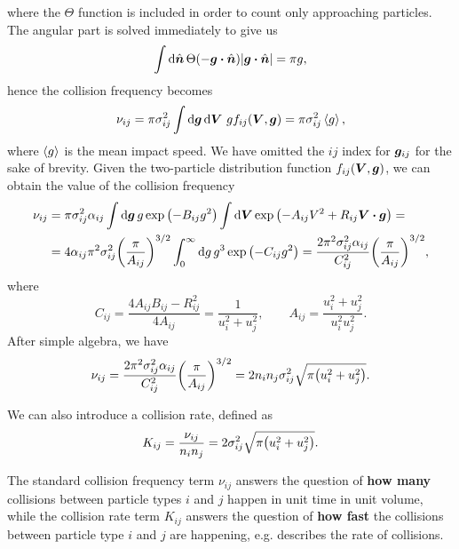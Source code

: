 \documentclass[aps,prl,preprint,groupedaddress,10pt]{revtex4-2}
\begin{document}
where the $\Theta$ function is included in order to count only approaching particles. The angular part is
solved immediately to give us
\begin{equation}
    \int\dd{\bn}\Theta\pqty{-\bg\vdot\bn}\abs{\bg\vdot\bn}=\pi g,
\end{equation}
hence the collision frequency becomes
\begin{equation}
    \nu_{ij}=\pi\sigma_{ij}^2\int\dd{\bg}\dd{\bV}\,gf_{ij}\pqty{\bV,\bg}
    =\pi\sigma_{ij}^2\avg{g},
\end{equation}
where $\left\langle{g}\right\rangle$ is the mean impact speed. We have omitted the $ij$ index for $\vb*{g}_{ij}$ for the sake of
brevity. Given the two-particle distribution function
$f_{ij}(\vb*{V},\vb*{g})$, we can obtain the value of the collision frequency
\begin{equation}
    \begin{split}
        \nu_{ij}&=\pi\sigma_{ij}^2\alpha_{ij}\int\dd{\bg} g\exp\pqty{-B_{ij}g^2}
        \int\dd{\bV}\exp\pqty{-A_{ij}V^2+R_{ij}\bV\vdot\bg}=\\
        &=4\alpha_{ij}\pi^2\sigma_{ij}^2\pqty{\frac{\pi}{A_{ij}}}^{3/2}\int_{0}^{\infty}\dd{g} g^3
        \exp\pqty{-C_{ij}g^2}=
        \frac{2\pi^2\sigma_{ij}^2\alpha_{ij}}{C_{ij}^2}\pqty{\frac{\pi}{A_{ij}}}^{3/2},
    \end{split}
\end{equation}
where
\begin{equation}
    C_{ij}=\frac{4A_{ij}B_{ij}-R_{ij}^2}{4A_{ij}}=\frac{1}{u_i^2+u_j^2},\qquad
    A_{ij}=\frac{u_i^2+u_j^2}{u_i^2u_j^2}.
\end{equation}
After simple algebra, we have
\begin{equation}
    \nu_{ij}=\frac{2\pi^2\sigma_{ij}^2\alpha_{ij}}{C_{ij}^2}
    \pqty{\frac{\pi}{A_{ij}}}^{3/2}=2n_in_j\sigma_{ij}^2\sqrt{\pi\pqty{u_i^2+u_j^2}}.
\end{equation}

We can also introduce a collision rate, defined as
\begin{equation}
    K_{ij}=\frac{\nu_{ij}}{n_in_j}=2\sigma_{ij}^2\sqrt{\pi\pqty{u_i^2+u_j^2}}.
\end{equation}

The standard collision frequency term $\nu_{ij}$ answers the question of {\bf how many} collisions between
particle types $i$ and $j$ happen in unit time in unit volume, while the collision rate term $K_{ij}$
answers the question of {\bf how fast} the collisions between particle type $i$ and $j$ are
happening, e.g. describes the rate of collisions.
\end{document}
